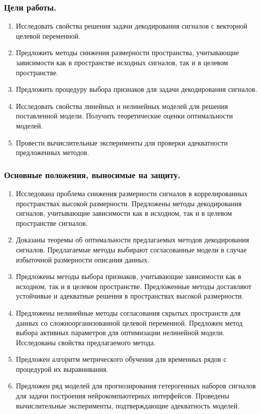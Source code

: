 \subsubsection{Цели работы.}
\begin{enumerate}
	\item Исследовать свойства решения задачи декодирования сигналов с векторной целевой переменной.
	\item Предложить методы снижения размерности пространства, учитывающие зависимости как в пространстве исходных сигналов, так и в целевом пространстве.
	\item Предложить процедуру выбора признаков для задачи декодирования сигналов.
	\item Исследовать свойства линейных и нелинейных моделей для решения поставленной модели. Получить теоретические оценки оптимальности моделей.
	\item Провести вычислительные эксперименты для проверки адекватности предложенных методов.
\end{enumerate}

\subsubsection{Основные положения, выносимые на защиту.}
\begin{enumerate}
	\item Исследована проблема снижения размерности сигналов в коррелированных пространствах высокой размерности. Предложены методы декодирования сигналов, учитывающие зависимости как в исходном, так и в целевом пространстве сигналов.
	\item Доказаны теоремы об оптимальности предлагаемых методов декодирования сигналов. Предлагаемые методы выбирают согласованные модели в случае избыточной размерности описания данных.
	\item Предложены методы выбора признаков, учитывающие зависимости как в исходном, так и в целевом пространстве. Предложенные методы доставляют устойчивые и адекватные решения в пространствах высокой размерности. 
	\item Предложены нелинейные методы согласования скрытых пространств для данных со сложноорганизованной целевой переменной. Предложен метод выбора активных параметров для оптимизации нелинейной модели. Исследованы свойства предлагаемого метода.
	\item Предложен алгоритм метрического обучения для временных рядов с процедурой их выравнивания.
	\item Предложен ряд моделей для прогнозирования гетерогенных наборов сигналов для задачи построения нейрокомпьютерных интерфейсов. Проведены вычислительные эксперименты, подтверждающие адекватность моделей.
\end{enumerate}

